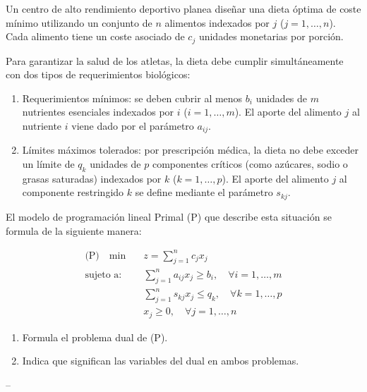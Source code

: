 Un centro de alto rendimiento deportivo planea diseñar una dieta óptima de coste mínimo utilizando un conjunto de $n$ alimentos indexados por $j$ ($j = 1, \dots, n$). Cada alimento tiene un coste asociado de $c_j$ unidades monetarias por porción. 

Para garantizar la salud de los atletas, la dieta debe cumplir simultáneamente con dos tipos de requerimientos biológicos:
\begin{enumerate}
    \item Requerimientos mínimos: se deben cubrir al menos $b_i$ unidades de $m$ nutrientes esenciales indexados por $i$ ($i = 1, \dots, m$). El aporte del alimento $j$ al nutriente $i$ viene dado por el parámetro $a_{ij}$.
    \item Límites máximos tolerados: por prescripción médica, la dieta no debe exceder un límite de $q_k$ unidades de $p$ componentes críticos (como azúcares, sodio o grasas saturadas) indexados por $k$ ($k = 1, \dots, p$). El aporte del alimento $j$ al componente restringido $k$ se define mediante el parámetro $s_{kj}$.
\end{enumerate}

El modelo de programación lineal Primal (P) que describe esta situación se formula de la siguiente manera:

\begin{align*}
\text{(P)} \quad \min \quad & z = \sum_{j=1}^{n} c_j x_j \\
\text{sujeto a:} \quad & \sum_{j=1}^{n} a_{ij} x_j \ge b_i, \quad \forall i = 1, \dots, m \\
& \sum_{j=1}^{n} s_{kj} x_j \le q_k, \quad \forall k = 1, \dots, p \\
& x_j \ge 0, \quad \forall j = 1, \dots, n
\end{align*}

\begin{enumerate}
    \item Formula el problema dual de (P).
    \item Indica que significan las variables del dual en ambos problemas.
\end{enumerate}

-- 


